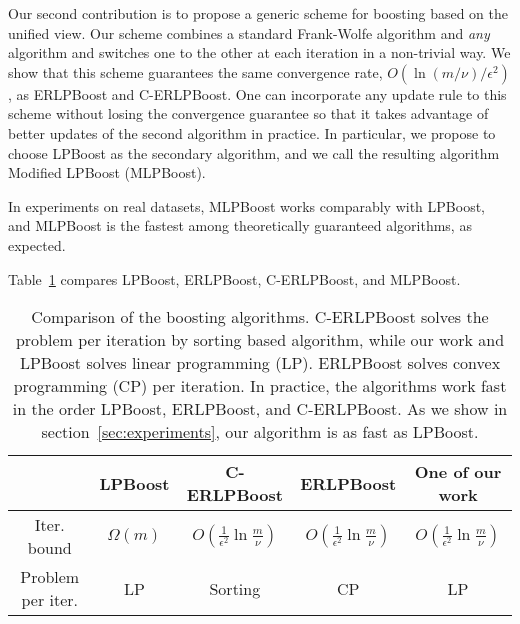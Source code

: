 Our second contribution is to propose
a generic scheme for boosting based on the unified view.
Our scheme combines a standard Frank-Wolfe algorithm and \emph{any} algorithm 
and switches one to the other at each iteration in a non-trivial way.
We show that this scheme guarantees 
the same convergence rate, $O(\ln(m/\nu) / \epsilon^2)$,  
as ERLPBoost and C-ERLPBoost.
One can incorporate any update rule to this scheme
without losing the convergence guarantee 
so that it takes advantage of better updates 
of the second algorithm in practice.
In particular, 
we propose to choose LPBoost 
as the secondary algorithm, 
and we call the resulting algorithm 
Modified LPBoost (MLPBoost). 

In experiments on real datasets, 
MLPBoost works comparably with LPBoost, and 
MLPBoost is the fastest 
among theoretically guaranteed algorithms, as expected. 


Table~\ref{table:boosting_comparison} compares 
LPBoost, ERLPBoost, C-ERLPBoost, and MLPBoost. 
\begin{table}[t]
    \centering
    \caption{%
        Comparison of the boosting algorithms. %
        C-ERLPBoost solves the problem per iteration %
        by sorting based algorithm, while our work and %
        LPBoost solves linear programming (LP). %
        ERLPBoost solves convex programming (CP) per iteration. %
        In practice, the algorithms work fast in the order %
        LPBoost, ERLPBoost, and C-ERLPBoost. %
        As we show in section~\ref{sec:experiments}, %
        our algorithm is as fast as LPBoost. %
    }
    \label{table:boosting_comparison}
    \begin{tabular}{|c|cccc|}
        \toprule
                    & LPBoost & C-ERLPBoost & ERLPBoost & One of our work \\
        \midrule
        Iter. bound 
            & $\Omega(m)$ 
            & $O\left(\frac{1}{\epsilon^2} \ln \frac{m}{\nu}\right)$ 
            & $O\left(\frac{1}{\epsilon^2} \ln \frac{m}{\nu}\right)$ 
            & $O\left(\frac{1}{\epsilon^2} \ln \frac{m}{\nu}\right)$ \\
        Problem per iter. & LP & Sorting & CP & LP \\
        \bottomrule
    \end{tabular}
\end{table}

